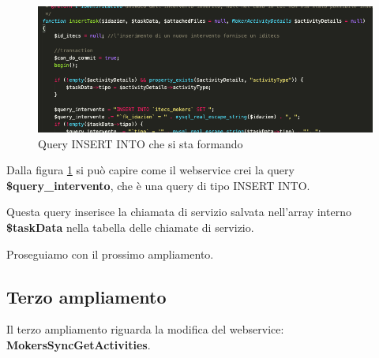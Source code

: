 \begin{figure}[!h] 
	\centering
	\includegraphics[scale = 0.5]{immagini/webservices/ampliamenti/2ampl_funzione_insert.png}
	\caption{Query INSERT INTO che si sta formando}
	\label{fig:5-7}
\end{figure}

\begin{flushleft}
	Dalla figura \ref{fig:5-7} si può capire come il webservice crei la query \textbf{\$query\_intervento}, che è una query di tipo INSERT INTO.
	
	Questa query inserisce la chiamata di servizio salvata nell'array interno \textbf{\$taskData} nella tabella delle chiamate di servizio.
	
	\newspace
	
	Proseguiamo con il prossimo ampliamento.
\end{flushleft}

\newpage

\subsection{Terzo ampliamento}
Il terzo ampliamento riguarda la modifica del webservice:  \textbf{MokersSyncGetActivities}.

